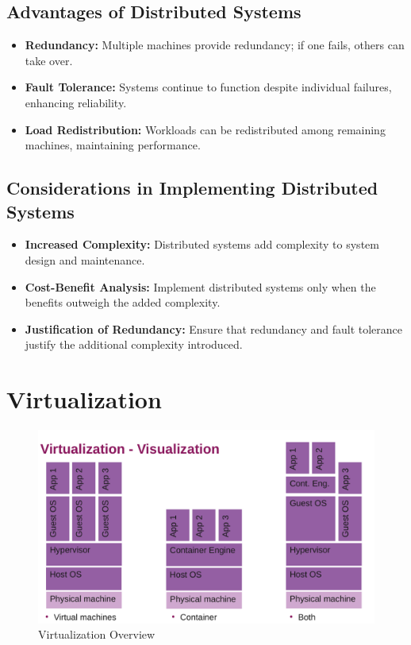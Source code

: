 \documentclass[../Main.tex]{subfiles}
\begin{document}
\subsection{Advantages of Distributed Systems}

\begin{itemize}
    \item \textbf{Redundancy:} Multiple machines provide redundancy; if one fails, others can take over.
    \item \textbf{Fault Tolerance:} Systems continue to function despite individual failures, enhancing reliability.
    \item \textbf{Load Redistribution:} Workloads can be redistributed among remaining machines, maintaining performance.
\end{itemize}

\subsection{Considerations in Implementing Distributed Systems}

\begin{itemize}
    \item \textbf{Increased Complexity:} Distributed systems add complexity to system design and maintenance.
    \item \textbf{Cost-Benefit Analysis:} Implement distributed systems only when the benefits outweigh the added complexity.
    \item \textbf{Justification of Redundancy:} Ensure that redundancy and fault tolerance justify the additional complexity introduced.
\end{itemize}

\section{Virtualization}

\begin{figure}[H]
    \centering
    \includegraphics[width=0.75\linewidth]{Images/virtualization.png}
    \caption{Virtualization Overview}
\end{figure}
\end{document}
